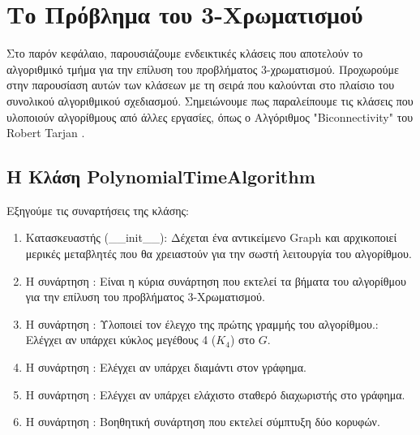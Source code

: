 \section{Το Πρόβλημα του 3-Χρωματισμού}

Στο παρόν κεφάλαιο, παρουσιάζουμε ενδεικτικές κλάσεις που αποτελούν το αλγοριθμικό τμήμα για την επίλυση του προβλήματος 3-χρωματισμού. Προχωρούμε στην παρουσίαση αυτών των κλάσεων με τη σειρά που καλούνται στο πλαίσιο του συνολικού αλγοριθμικού σχεδιασμού. Σημειώνουμε πως παραλείπουμε τις κλάσεις που υλοποιούν αλγορίθμους από άλλες εργασίες, όπως ο Αλγόριθμος "Biconnectivity" του Robert Tarjan \cite{tarjan-depth-first-search}.

\subsection{H Kλάση PolynomialTimeAlgorithm}





Εξηγούμε τις συναρτήσεις της κλάσης:

\begin{enumerate}
	\item Κατασκευαστής (\_\_init\_\_): Δέχεται ένα αντικείμενο Graph και αρχικοποιεί μερικές μεταβλητές που θα χρειαστούν για την σωστή λειτουργία του αλγορίθμου.
	
	\item H συνάρτηση : Είναι η κύρια συνάρτηση που εκτελεί τα βήματα του αλγορίθμου για την επίλυση του προβλήματος 3-Χρωματισμού.
	
	\item Η συνάρτηση : Υλοποιεί τον έλεγχο της πρώτης γραμμής του αλγορίθμου.: Ελέγχει αν υπάρχει κύκλος μεγέθους 4 ($K_4$) στο $G$.
	
	\item H συνάρτηση : Ελέγχει αν υπάρχει διαμάντι στον γράφημα.    
	
	\item H συνάρτηση :  Ελέγχει αν υπάρχει ελάχιστο σταθερό διαχωριστής στο γράφημα.
	
	\item H συνάρτηση :  Βοηθητική συνάρτηση που εκτελεί σύμπτυξη δύο κορυφών.
\end{enumerate}


